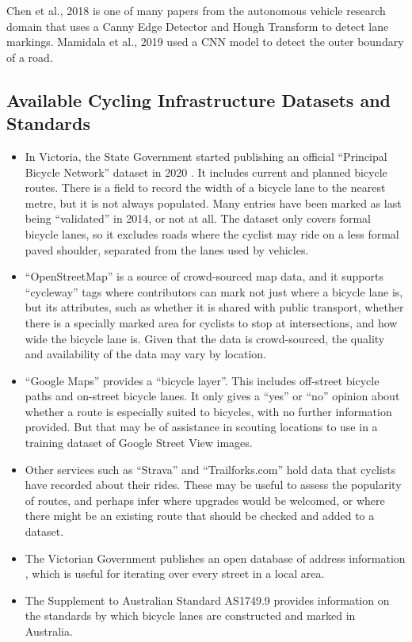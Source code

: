 \documentclass{article}
\begin{document}
Chen et al., 2018 \cite{7784064} is one of many papers from the autonomous vehicle research domain that uses a Canny Edge Detector and Hough Transform to detect lane markings.   Mamidala et al., 2019 \cite{8929655} used a CNN model to detect the outer boundary of a road.


\subsection{Available Cycling Infrastructure Datasets and Standards}

\begin{itemize}
\item{In Victoria, the State Government started publishing an official ``Principal Bicycle Network'' dataset in 2020 \cite{PrincipalBicycleNetwork}.  It includes current and planned bicycle routes.  There is a field to record the width of a bicycle lane to the nearest metre, but it is not always populated.  Many entries have been marked as last being ``validated'' in 2014, or not at all.  The dataset only covers formal bicycle lanes, so it excludes roads where the cyclist may ride on a less formal paved shoulder, separated from the lanes used by vehicles.}
\item{``OpenStreetMap'' \cite{OPENSTREETMAP} is a source of crowd-sourced map data, and it supports ``cycleway'' tags where contributors can mark not just where a bicycle lane is, but its attributes, such as whether it is shared with public transport, whether there is a specially marked area for cyclists to stop at intersections, and how wide the bicycle lane is.  Given that the data is crowd-sourced, the quality and availability of the data may vary by location.}
\item{``Google Maps'' provides a ``bicycle layer''.  This includes off-street bicycle paths and on-street bicycle lanes.  It only gives a ``yes'' or ``no'' opinion about whether a route is especially suited to bicycles, with no further information provided.  But that may be of assistance in scouting locations to use in a training dataset of Google Street View images.}
\item{Other services such as ``Strava'' and ``Trailforks.com'' hold data that cyclists have recorded about their rides.  These may be useful to assess the popularity of routes, and perhaps infer where upgrades would be welcomed, or where there might be an existing route that should be checked and added to a dataset.}
\item{The Victorian Government publishes an open database of address information \cite{vicmap}, which is useful for iterating over every street in a local area.}
\item{The Supplement to Australian Standard AS1749.9 \cite{as1742} provides information on the standards by which bicycle lanes are constructed and marked in Australia.}
\end{itemize}
\end{document}
